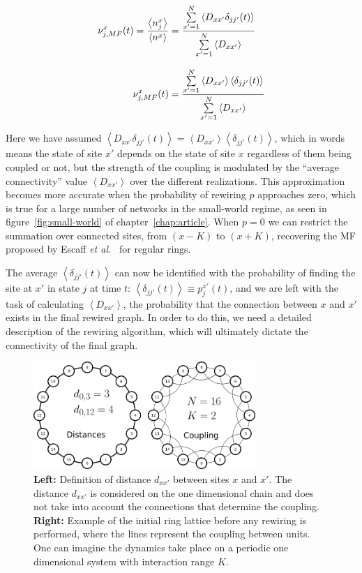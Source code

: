 \begin{align}
    \nu^x_{j,MF}(t) = \frac{\left<n^x_j\right>}{\left<n^x\right>} &= \frac{\sum\limits_{x'=1}^N\left< D_{xx'}\delta_{jj'}(t)\right>}{\sum\limits_{x'=1}^N\left< D_{xx'} \right>}
    \notag \\[8pt]
    \nu^x_{j,MF}(t) &= \frac{\sum\limits_{x'=1}^N\left< D_{xx'}\right>\left<\delta_{jj'}(t)\right>}{\sum\limits_{x'=1}^N\left< D_{xx'} \right>}
    \label{eq:numf}
\end{align}

\noindent Here we have assumed $\left< D_{xx'}\delta_{jj'}(t)\right> = \left< D_{xx'}\right>\left<\delta_{jj'}(t)\right>$, which in
words means the state of site $x'$ depends on the state of site $x$ regardless of them being coupled or not, but the strength of the
coupling is modulated by the ``average connectivity'' value $\left< D_{xx'} \right>$ over the different realizations. This
approximation becomes more accurate when the probability of rewiring $p$ approaches zero, which is true for a large number of networks
in the small-world regime, as seen in figure~\ref{fig:small-world} of chapter~\ref{chap:article}. When $p=0$ we can restrict the
summation over connected sites, from $(x-K)$ to $(x+K)$, recovering the MF proposed by Escaff \textit{et al.}~\cite{escaff2014arrays}
for regular rings.

The average $\left< \delta_{jj'}(t) \right>$ can now be identified with the probability of finding the site at $x'$ in state $j$ at
time $t$: $\left< \delta_{jj'}(t) \right> \equiv p^{x'}_j(t)$, and we are left with the task of calculating $\left< D_{xx'} \right>$,
the probability that the connection between $x$ and $x'$ exists in the final rewired graph.  In order to do this, we need a detailed
description of the rewiring algorithm, which will ultimately dictate the connectivity of the final graph. 

\begin{figure}
    \centering
    \includegraphics[width=0.75\textwidth]{fig/ring-distance.png}
    \caption{\label{fig:ring-distance}
        \textbf{Left:} Definition of distance $d_{xx'}$ between sites $x$ and $x'$. The distance $d_{xx'}$ is considered on the one
        dimensional chain and does not take into account the connections that determine the coupling.\\
        \textbf{Right:} Example of the initial ring lattice before any rewiring is performed, where the lines represent the coupling
        between units.\\
        One can imagine the dynamics take place on a periodic one dimensional system with interaction range $K$.
    }
\end{figure}


